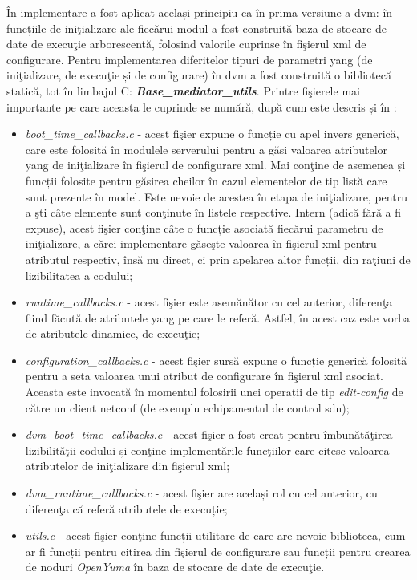 În implementare a fost aplicat același principiu ca în prima versiune a \gls{dvm}: în funcțiile de iniţializare ale fiecărui modul a fost construită baza de stocare de date de execuţie arborescentă, folosind valorile cuprinse în fişierul \gls{xml} de configurare. Pentru implementarea diferitelor tipuri de parametri \gls{yang} (de iniţializare, de execuţie și de configurare) în \gls{dvm} a fost construită o bibliotecă statică, tot în limbajul C: \textit{\textbf{Base\_mediator\_utils}}. Printre fişierele mai importante pe care aceasta le cuprinde se numără, după cum este descris și în \cite{stancu2017enabling}:
\begin{itemize}
	\item \textit{boot\_time\_callbacks.c} - acest fişier expune o funcție cu apel invers generică, care este folosită în modulele serverului pentru a găsi valoarea atributelor \gls{yang} de iniţializare în fişierul de configurare \gls{xml}. Mai conţine de asemenea și funcții folosite pentru găsirea cheilor în cazul elementelor de tip listă care sunt prezente în model. Este nevoie de acestea în etapa de iniţializare, pentru a şti câte elemente sunt conţinute în listele respective. Intern (adică fără a fi expuse), acest fişier conţine câte o funcție asociată fiecărui parametru de iniţializare, a cărei implementare găseşte valoarea în fişierul \gls{xml} pentru atributul respectiv, însă nu direct, ci prin apelarea altor funcții, din raţiuni de lizibilitatea a codului;
	
	\item \textit{runtime\_callbacks.c} - acest fişier este asemănător cu cel anterior, diferenţa fiind făcută de atributele \gls{yang} pe care le referă. Astfel, în acest caz este vorba de atributele dinamice, de execuţie;
	
	\item \textit{configuration\_callbacks.c} - acest fişier sursă expune o funcție generică folosită pentru a seta valoarea unui atribut de configurare în fişierul \gls{xml} asociat. Aceasta este invocată în momentul folosirii unei operații de tip \textit{edit-config} de către un client \gls{netconf} (de exemplu echipamentul de control \gls{sdn});
	
	\item \textit{dvm\_boot\_time\_callbacks.c} - acest fişier a fost creat pentru îmbunătăţirea lizibilităţii codului și conţine implementările funcţiilor care citesc valoarea atributelor de iniţializare din fişierul \gls{xml};
	
	\item \textit{dvm\_runtime\_callbacks.c} - acest fişier are același rol cu cel anterior, cu diferenţa că referă atributele de execuție;
	
	\item \textit{utils.c} - acest fişier conţine funcții utilitare de care are nevoie biblioteca, cum ar fi funcții pentru citirea din fişierul de configurare sau funcții pentru crearea de noduri \textit{OpenYuma} în baza de stocare de date de execuţie.
\end{itemize}

